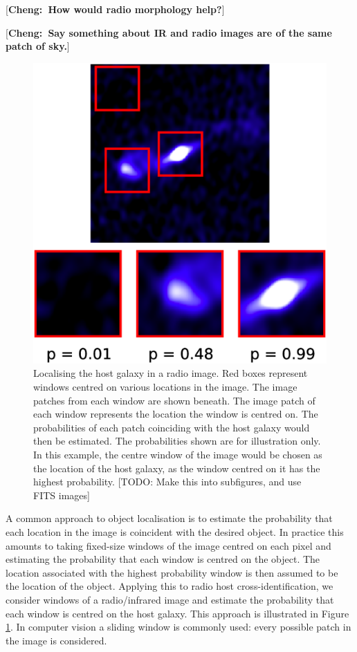 \documentclass[fleqn,usenatbib,usedcolumn]{mnras}
\newcommand{\cheng}[1]{ {\color{teal}[{\bf Cheng:~{#1}}]} }
\begin{document}
    \cheng{How would radio morphology help?}

    \cheng{Say something about IR and radio images are of the same patch of sky.}

    \begin{figure}
      \centering
      \includegraphics[width=0.8\columnwidth]{images/windows.eps}
      \caption{Localising the host galaxy in a radio image. Red boxes
        represent windows centred on various locations in the image. The image
        patches from each window are shown beneath. The image patch of each
        window represents the location the window is centred on. The
        probabilities of each patch coinciding with the host galaxy would then
        be estimated. The probabilities shown are for illustration only. In
        this example, the centre window of the image would be chosen as the
        location of the host galaxy, as the window centred on it has the
        highest probability. [TODO: Make this into subfigures, and use FITS
        images]}
      \label{fig:windows}
    \end{figure}

    A common approach to object localisation is to estimate the probability
    that each location in the image is coincident with the desired object. In
    practice this amounts to taking fixed-size windows of the image centred on
    each pixel and estimating the probability that each window is centred on
    the object. The location associated with the highest probability window is
    then assumed to be the location of the object. Applying this to radio host
    cross-identification, we consider windows of a radio/infrared image and
    estimate the probability that each window is centred on the host galaxy.
    This approach is illustrated in Figure \ref{fig:windows}.
    In computer vision a sliding window is commonly used: every possible patch
    in the image is considered.
\end{document}
